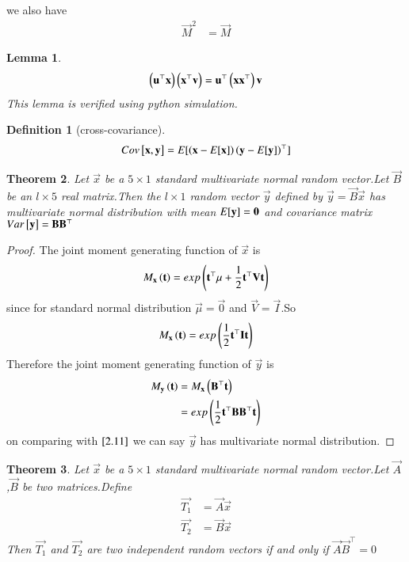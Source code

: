 \documentclass[journal,12pt,twocolumn]{IEEEtran}
\newtheorem{theorem}{Theorem}[section]
\newtheorem{lemma}[theorem]{Lemma}
\newtheorem{definition}{Definition}[section]
\begin{document}
we also have 
\begin{align}
    \vec{M}^2&=\vec{M}
\end{align}
\begin{lemma}
\begin{align}
   \left(\mathbf{u}^{\top}\mathbf{x}\right)\left(\mathbf{x}^{\top}\mathbf{v}\right)=\mathbf{u}^{\top}\left(\mathbf{x}\mathbf{x}^{\top}\right)\mathbf{v}
\end{align}
This lemma is verified using python simulation.
\end{lemma}
\begin{definition}[cross-covariance]
\begin{align}
    Cov{}\left[\mathbf{x},\mathbf{y}\right]=E[ \left(\mathbf{x}-E[ \mathbf{x} ]\right)\left(\mathbf{y}-E[ \mathbf{y} ]\right)^{\top} ]
\end{align}
\end{definition}
\begin{theorem}
\label{t2.2}
Let $\vec{x}$ be a $5\times 1$ standard multivariate normal random vector.Let $\vec{B}$ be an $l\times 5$ real matrix.Then the $l\times 1$ random vector $\vec{y}$ defined by $\vec{y}=\vec{B}\vec{x}$ has multivariate normal distribution with mean $E[ \mathbf{y} ]=\mathbf{0}$ and covariance matrix $Var{}\left[\mathbf{y}\right]=\mathbf{B}\mathbf{B}^{\top}$ 
\end{theorem}
\begin{proof}
The joint moment generating function of $\vec{x}$ is
\begin{align}
    M_{\mathbf{x}}\left(\mathbf{t}\right)=exp\left(\mathbf{t}^{\top}\mu+\frac{1}{2}\mathbf{t}^{\top}\mathbf{V}\mathbf{t}\right)
\end{align}
since for standard normal distribution $\vec{\mu}=\vec{0}$ and $\vec{V}=\vec{I}$.So
\begin{align}
     M_{\mathbf{x}}\left(\mathbf{t}\right)=exp\left(\frac{1}{2}\mathbf{t}^{\top}\mathbf{I}\mathbf{t}\right)\label{2.11}
\end{align}
Therefore the joint moment generating function of $\vec{y}$ is
\begin{align}
    M_{\mathbf{y}}\left(\mathbf{t}\right)&=M_{\mathbf{x}}\left(\mathbf{B}^{\top}\mathbf{t}\right)\\
    &=exp\left(\frac{1}{2}\mathbf{t}^{\top}\mathbf{B}\mathbf{B}^{\top}\mathbf{t}\right)
\end{align}
on comparing with $\eqref{2.11}$ we can say $\vec{y}$ has multivariate normal distribution. 
\end{proof}
\begin{theorem}
\label{t2.3}
Let $\vec{x}$ be a $5\times 1$ standard multivariate normal random vector.Let $\vec{A}$ ,$\vec{B}$ be two matrices.Define
\begin{align}
    \vec{T_1}&=\vec{A}\vec{x}\\
    \vec{T_2}&=\vec{B}\vec{x}
\end{align}
Then $\vec{T_1}$ and $\vec{T_2}$ are two independent random vectors if and only if $\vec{A}\vec{B}^{\top}=0$
\end{theorem}
\end{document}
